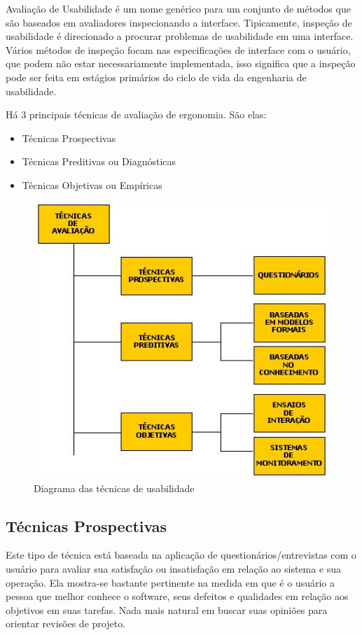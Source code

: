 Avaliação de Usabilidade é um nome genérico para um conjunto de métodos que são baseados em avaliadores inspecionando a interface. Tipicamente, inspeção de usabilidade é direcionado a procurar problemas de usabilidade em uma interface. Vários métodos de inspeção focam nas especificações de interface com o usuário, que podem não estar necessariamente implementada, isso significa que a inspeção pode ser feita em estágios primários do ciclo de vida da engenharia de usabilidade. \cite{nielsen_95}

Há 3 principais técnicas de avaliação de ergonomia. São elas:

\begin{itemize}
  \item Técnicas Prospectivas
  \item Técnicas Preditivas ou Diagnósticas
  \item Técnicas Objetivas ou Empíricas
\end{itemize}

\begin{figure}[here]
\includegraphics[width=120mm]{images/tecnicas_usabilidade.jpg}
\caption{Diagrama das técnicas de usabilidade}
\label{fig:tecnicas_usabilidade}
\end{figure}

\subsection{Técnicas Prospectivas}

Este tipo de técnica está baseada na aplicação de questionários/entrevistas com o usuário para avaliar sua satisfação ou insatisfação em relação ao sistema e sua operação. Ela mostra-se bastante pertinente na medida em que é o usuário a pessoa que melhor conhece o software, seus defeitos e qualidades em relação aos objetivos em suas tarefas. Nada mais natural em buscar suas opiniões para orientar revisões de projeto.

